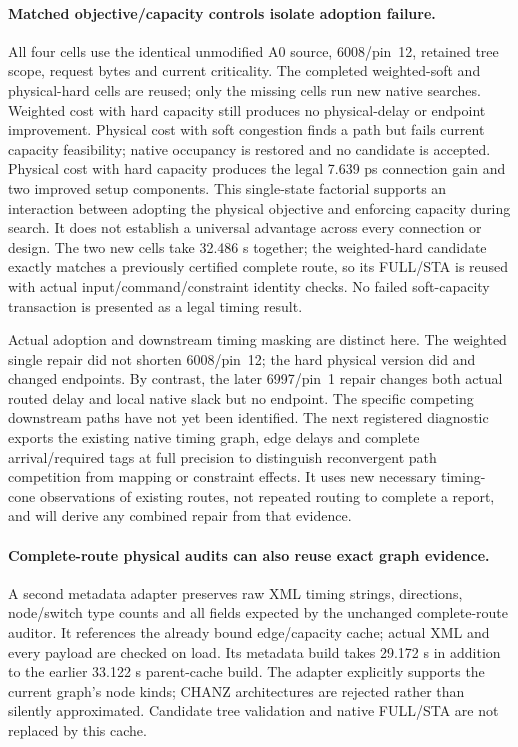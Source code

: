 \paragraph{Matched objective/capacity controls isolate adoption failure.}
All four cells use the identical unmodified A0 source, 6008/pin~12, retained tree scope, request bytes and current criticality. The completed weighted-soft and physical-hard cells are reused; only the missing cells run new native searches. Weighted cost with hard capacity still produces no physical-delay or endpoint improvement. Physical cost with soft congestion finds a path but fails current capacity feasibility; native occupancy is restored and no candidate is accepted. Physical cost with hard capacity produces the legal 7.639 ps connection gain and two improved setup components. This single-state factorial supports an interaction between adopting the physical objective and enforcing capacity during search. It does not establish a universal advantage across every connection or design. The two new cells take 32.486 s together; the weighted-hard candidate exactly matches a previously certified complete route, so its FULL/STA is reused with actual input/command/constraint identity checks. No failed soft-capacity transaction is presented as a legal timing result.

Actual adoption and downstream timing masking are distinct here. The weighted single repair did not shorten 6008/pin~12; the hard physical version did and changed endpoints. By contrast, the later 6997/pin~1 repair changes both actual routed delay and local native slack but no endpoint. The specific competing downstream paths have not yet been identified. The next registered diagnostic exports the existing native timing graph, edge delays and complete arrival/required tags at full precision to distinguish reconvergent path competition from mapping or constraint effects. It uses new necessary timing-cone observations of existing routes, not repeated routing to complete a report, and will derive any combined repair from that evidence.

\paragraph{Complete-route physical audits can also reuse exact graph evidence.}
A second metadata adapter preserves raw XML timing strings, directions, node/switch type counts and all fields expected by the unchanged complete-route auditor. It references the already bound edge/capacity cache; actual XML and every payload are checked on load. Its metadata build takes 29.172 s in addition to the earlier 33.122 s parent-cache build. The adapter explicitly supports the current graph's node kinds; CHANZ architectures are rejected rather than silently approximated. Candidate tree validation and native FULL/STA are not replaced by this cache.

